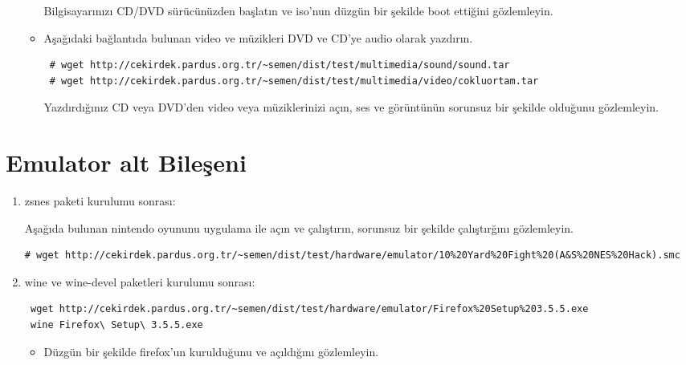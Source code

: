 \documentclass[a4paper,10pt]{article}
\begin{document}
\begin{enumerate}
\begin{itemize}
Bilgisayarınızı CD/DVD sürücünüzden başlatın ve iso'nun düzgün bir şekilde boot ettiğini gözlemleyin.

\item Aşağıdaki bağlantıda bulunan video ve müzikleri DVD ve CD'ye audio olarak yazdırın. 
\begin{verbatim}
 # wget http://cekirdek.pardus.org.tr/~semen/dist/test/multimedia/sound/sound.tar
 # wget http://cekirdek.pardus.org.tr/~semen/dist/test/multimedia/video/cokluortam.tar
\end{verbatim}
Yazdırdığınız CD veya DVD'den video veya müziklerinizi açın, ses ve görüntünün sorunsuz bir şekilde olduğunu gözlemleyin.

\end{itemize}

\end{enumerate}
\section{Emulator alt Bileşeni}
\begin{enumerate}
 \item zsnes paketi kurulumu sonrası:

Aşağıda bulunan nintendo oyununu uygulama ile açın ve çalıştırın, sorunsuz bir şekilde çalıştırğını gözlemleyin.
\begin{verbatim}
# wget http://cekirdek.pardus.org.tr/~semen/dist/test/hardware/emulator/10%20Yard%20Fight%20(A&S%20NES%20Hack).smc 
\end{verbatim}

 \item wine ve wine-devel paketleri kurulumu sonrası:
\begin{verbatim}
 wget http://cekirdek.pardus.org.tr/~semen/dist/test/hardware/emulator/Firefox%20Setup%203.5.5.exe
 wine Firefox\ Setup\ 3.5.5.exe
\end{verbatim}
\begin{itemize}
 \item Düzgün bir şekilde firefox'un kurulduğunu ve açıldığını gözlemleyin.
 \end{itemize}

\end{enumerate}
\end{document}
